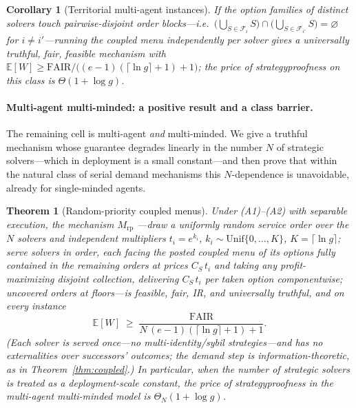 \documentclass[11pt]{article}
\newtheorem{theorem}{Theorem}
\newtheorem{corollary}{Corollary}
\theoremstyle{remark}
\newcommand{\FAIR}{\mathrm{FAIR}}
\newcommand{\E}{\mathbb{E}}
\begin{document}
\begin{corollary}[Territorial multi-agent instances]\label{cor:territorial}
If the option families of distinct solvers touch pairwise-disjoint order
blocks---i.e.\ $\big(\bigcup_{S\in\mathcal F_i}S\big)\cap
\big(\bigcup_{S\in\mathcal F_{i'}}S\big)=\varnothing$ for $i\ne
i'$---running the coupled menu independently per solver gives a
universally truthful, fair, feasible mechanism with
$\E[W]\ge\FAIR/\big((e-1)(\lceil\ln g\rceil+1)+1\big)$; the price of
strategyproofness on this class is $\Theta(1+\log g)$.
\end{corollary}

\paragraph{Multi-agent multi-minded: a positive result and a class
barrier.}
The remaining cell is multi-agent \emph{and} multi-minded. We give a
truthful mechanism whose guarantee degrades linearly in the number $N$ of
strategic solvers---which in deployment is a small constant---and then
prove that within the natural class of serial demand mechanisms this
$N$-dependence is unavoidable, already for single-minded agents.

\begin{theorem}[Random-priority coupled menus]\label{thm:randprio}
Under (A1)--(A2) with separable execution, the mechanism $M_{\mathrm{rp}}$
---draw a uniformly random service order over the $N$ solvers and
independent multipliers $t_i=e^{k_i}$, $k_i\sim\mathrm{Unif}\{0,\dots,K\}$,
$K=\lceil\ln g\rceil$; serve solvers in order, each facing the posted
coupled menu of its options fully contained in the remaining orders at
prices $C_S\,t_i$ and taking any profit-maximizing disjoint collection,
delivering $C_S\,t_i$ per taken option componentwise; uncovered orders at
floors---is feasible, fair, IR, and universally truthful, and on every
instance
\[
\E[W]\;\ge\;\frac{\FAIR}{N\,(e-1)(\lceil\ln g\rceil+1)+1}.
\]
(Each solver is served once---no multi-identity/sybil strategies---and has
no externalities over successors' outcomes; the demand step is
information-theoretic, as in Theorem~\ref{thm:coupled}.) In particular,
when the number of strategic solvers is treated as a deployment-scale
constant, the price of strategyproofness in the multi-agent multi-minded
model is $\Theta_N(1+\log g)$.
\end{theorem}
\end{document}
